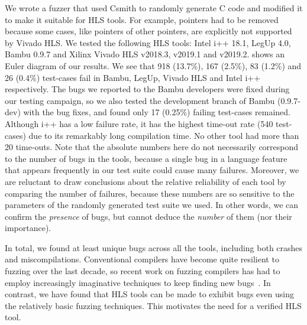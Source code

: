We wrote a fuzzer that used Csmith to randomly generate C code and modified it
to make it suitable for HLS tools.  For example, pointers had to be removed
because some cases, like pointers of other pointers, are explicitly not
supported by Vivado HLS.  We tested the following \gls{HLS} tools: Intel i++
18.1, LegUp 4.0, Bambu 0.9.7 and Xilinx Vivado HLS v2018.3, v2019.1 and v2019.2.
 shows an Euler diagram of our results.  We see that
918 (13.7\%), 167 (2.5\%), 83 (1.2\%) and 26 (0.4\%) test-cases fail in Bambu,
LegUp, Vivado HLS and Intel i++ respectively.  The bugs we reported to the Bambu
developers were fixed during our testing campaign, so we also tested the
development branch of Bambu (0.9.7-dev) with the bug fixes, and found only 17
(0.25\%) failing test-cases remained.  Although i++ has a low failure rate, it
has the highest time-out rate (540 test-cases) due to its remarkably long
compilation time. No other tool had more than 20 time-outs.  Note that the
absolute numbers here do not necessarily correspond to the number of bugs in the
tools, because a single bug in a language feature that appears frequently in our
test suite could cause many failures.  Moreover, we are reluctant to draw
conclusions about the relative reliability of each tool by comparing the number
of failures, because these numbers are so sensitive to the parameters of the
randomly generated test suite we used. In other words, we can confirm the
\emph{presence} of bugs, but cannot deduce the \emph{number} of them (nor their
importance).

In total, we found at least \numuniquebugs{} unique bugs across all the tools,
including both crashes and miscompilations.  Conventional compilers have become
quite resilient to fuzzing over the last decade, so recent work on fuzzing
compilers has had to employ increasingly imaginative techniques to keep finding
new bugs~\cite{even-mendoza20_ce}.  In contrast, we have found that HLS tools
can be made to exhibit bugs even using the relatively basic fuzzing techniques.
This motivates the need for a verified \gls{HLS} tool.

